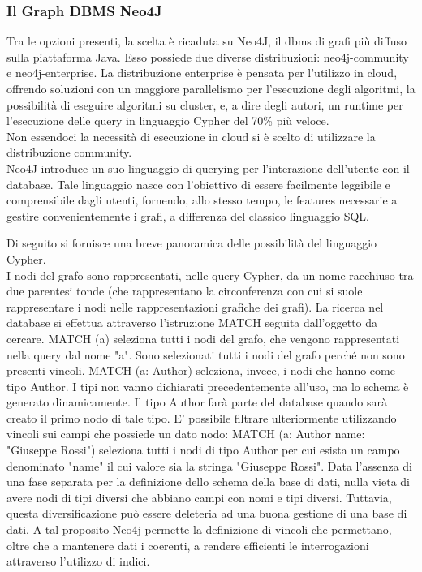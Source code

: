 \documentclass[a4paper,12pt]{article}
\begin{document}
\subsubsection{Il Graph DBMS Neo4J}
Tra le opzioni presenti, la scelta è ricaduta su Neo4J, il dbms di grafi più diffuso sulla piattaforma Java. Esso possiede due diverse distribuzioni: neo4j-community e neo4j-enterprise. La distribuzione enterprise è pensata per l'utilizzo in cloud, offrendo soluzioni con un maggiore parallelismo per l'esecuzione degli algoritmi, la possibilità di eseguire algoritmi su cluster, e, a dire degli autori, un runtime per l'esecuzione delle query in linguaggio Cypher del 70\% più veloce. \\
Non essendoci la necessità di esecuzione in cloud si è scelto di utilizzare la distribuzione community. \\
Neo4J introduce un suo linguaggio di querying per l'interazione dell'utente con il database. Tale linguaggio nasce con l'obiettivo di essere facilmente leggibile e comprensibile dagli utenti, fornendo, allo stesso tempo, le features necessarie a gestire convenientemente i grafi, a differenza del classico linguaggio SQL.
\par
Di seguito si fornisce una breve panoramica delle possibilità del linguaggio Cypher. \\
I nodi del grafo sono rappresentati, nelle query Cypher, da un nome racchiuso tra due parentesi tonde (che rappresentano la circonferenza con cui si suole rappresentare i nodi nelle rappresentazioni grafiche dei grafi). La ricerca nel database si effettua attraverso l'istruzione MATCH seguita dall'oggetto da cercare.
MATCH (a) seleziona tutti i nodi del grafo, che vengono rappresentati nella query dal nome "a". Sono selezionati tutti i nodi del grafo perché non sono presenti vincoli.
MATCH (a: Author) seleziona, invece, i nodi che hanno come tipo Author. I tipi non vanno dichiarati precedentemente all'uso, ma lo schema è generato dinamicamente. Il tipo Author farà parte del database quando sarà creato il primo nodo di tale tipo.
E' possibile filtrare ulteriormente utilizzando vincoli sui campi che possiede un dato nodo:
MATCH (a: Author {name: "Giuseppe Rossi"}) seleziona tutti i nodi di tipo Author per cui esista un campo denominato "name" il cui valore sia la stringa "Giuseppe Rossi". Data l'assenza di una fase separata per la definizione dello schema della base di dati, nulla vieta di avere nodi di tipi diversi che abbiano campi con nomi e tipi diversi. Tuttavia, questa diversificazione può essere deleteria ad una buona gestione di una base di dati. A tal proposito Neo4j permette la definizione di vincoli che permettano, oltre che a mantenere dati i coerenti, a rendere efficienti le interrogazioni attraverso l'utilizzo di indici.
\end{document}
